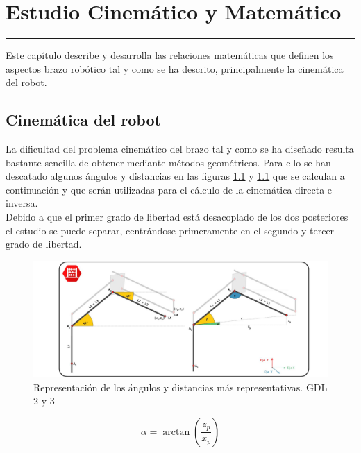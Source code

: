 \chapter{Estudio Cinemático y Matemático} \label{chap:Cinematica}
\hrule
\vspace{3mm}

Este capítulo describe y desarrolla las relaciones matemáticas que definen los aspectos brazo robótico tal y como se ha descrito, principalmente la cinemática del robot.

\section{Cinemática del robot}

    La dificultad del problema cinemático del brazo tal y como se ha diseñado resulta bastante sencilla de obtener mediante métodos geométricos. Para ello se han descatado algunos ángulos y distancias en las figuras \ref{fig:Control:cinematica_1} y \ref{fig:Control:cinematica_1} que se calculan a continuación y que serán utilizadas para el cálculo de la cinemática directa e inversa.
    \\

    Debido a que el primer grado de libertad está desacoplado de los dos posteriores el estudio se puede separar, centrándose primeramente en el segundo y tercer grado de libertad.

    \begin{figure}[H]
        \centering
        \includegraphics[width=1\textwidth]{figuras/Imagenes_cinematica/cinematica_1.jpg}
        \caption{Representación de los ángulos y distancias más representativas. GDL 2 y 3}
        \label{fig:Control:cinematica_1}
    \end{figure}



    \begin{equation}
        \alpha = \arctan\left(\frac{z_p}{x_p}\right)
    \end{equation}

